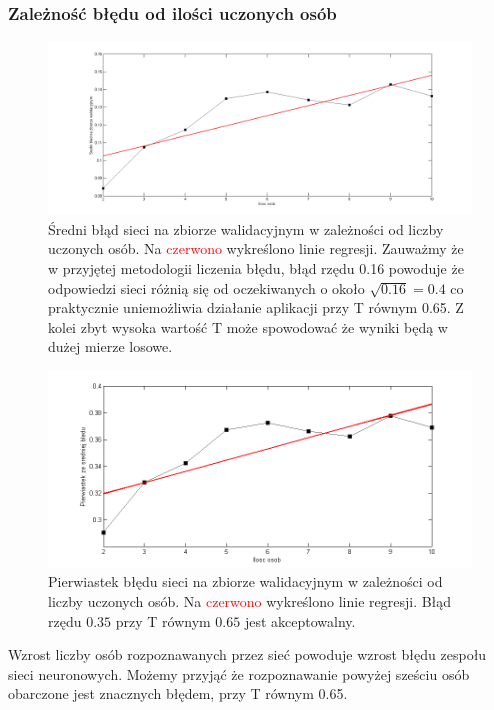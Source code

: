 \documentclass[a4paper]{article}
\begin{document}
		\subsubsection*{Zależność błędu od ilości uczonych osób}	
			\begin{figure}[h]
				\centering
				\includegraphics[width=\textwidth,trim= 3cm 0cm 3cm 0cm, clip]{./img/b_od_lo}
				\caption{Średni błąd sieci na zbiorze walidacyjnym w zależności od liczby uczonych osób.
				Na \textcolor{red}{czerwono} wykreślono linie regresji. Zauważmy że w przyjętej metodologii
				liczenia błędu, błąd rzędu 0.16 powoduje że odpowiedzi sieci różnią się od oczekiwanych
				o około $\sqrt{0.16} = 0.4$ co praktycznie uniemożliwia działanie aplikacji przy T równym
				0.65. Z kolei zbyt wysoka wartość T może spowodować że wyniki będą w dużej mierze losowe.}
				\label{fig:bodilos}
			\end{figure}
			\begin{figure}[h]
				\centering
				\includegraphics[width=\textwidth,trim= 1cm 0cm 1cm 0cm, clip]{./img/b_od_lo2}
				\caption{Pierwiastek błędu sieci na zbiorze walidacyjnym w zależności od liczby uczonych osób.
				Na \textcolor{red}{czerwono} wykreślono linie regresji. Błąd rzędu $0.35$ przy T równym
				$0.65$ jest akceptowalny.}
				\label{fig:bodilosd}
			\end{figure}
			Wzrost liczby osób rozpoznawanych przez sieć powoduje wzrost błędu
			zespołu sieci neuronowych. Możemy przyjąć że rozpoznawanie powyżej sześciu osób obarczone jest
			znacznych błędem, przy T równym 0.65.
			
\end{document}
